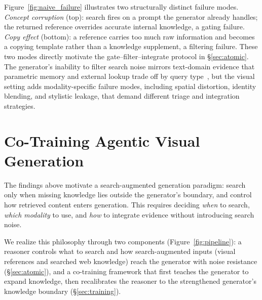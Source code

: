 \documentclass{article}
\begin{document}
Figure~\ref{fig:naive_failure} illustrates two structurally distinct failure modes.
\emph{Concept corruption} (top): search fires on a prompt the generator already handles; the returned reference overrides accurate internal knowledge, a gating failure.
\emph{Copy effect} (bottom): a reference carries too much raw information and becomes a copying template rather than a knowledge supplement, a filtering failure.
These two modes directly motivate the gate--filter--integrate protocol in \S\ref{sec:atomic}.
The generator's inability to filter search noise mirrors text-domain evidence that parametric memory and external lookup trade off by query type~\cite{mallen2023nottrust}, but the visual setting adds modality-specific failure modes, including spatial distortion, identity blending, and stylistic leakage, that demand different triage and integration strategies.


\section{Co-Training {Agentic}  Visual Generation}
\label{sec:method}

The findings above motivate a search-augmented generation paradigm: search only when missing knowledge lies outside the generator's boundary, and control how retrieved content enters generation.
This requires deciding \emph{when} to search, \emph{which modality} to use, and \emph{how} to integrate evidence without introducing search noise.


We realize this philosophy through two components (Figure~\ref{fig:pipeline}): a reasoner controls what to search and how search-augmented inputs (visual references and searched web knowledge) reach the generator with noise resistance (\S\ref{sec:atomic}), and a co-training framework that first teaches the generator to expand knowledge, then recalibrates the reasoner to the strengthened generator's knowledge boundary (\S\ref{sec:training}).  
\end{document}
